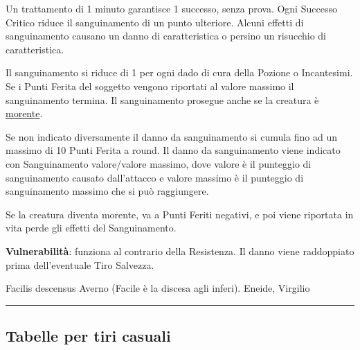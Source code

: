 \begin{multicols}{2}
Un trattamento di 1 minuto garantisce 1 successo, senza prova. Ogni Successo Critico riduce il sanguinamento di un punto ulteriore. Alcuni effetti di sanguinamento causano un danno di caratteristica o persino un risucchio di caratteristica.

Il sanguinamento si riduce di 1 per ogni dado di cura della Pozione o Incantesimi. Se i Punti Ferita del soggetto vengono riportati al valore massimo il sanguinamento termina. Il sanguinamento prosegue anche se la creatura è \hyperlink{morente}{morente}.

Se non indicato diversamente il danno da sanguinamento si cumula fino ad un massimo di 10 Punti Ferita a round. Il danno da sanguinamento viene indicato con Sanguinamento valore/valore massimo, dove valore è il punteggio di sanguinamento causato dall'attacco e valore massimo è il punteggio di sanguinamento massimo che si può raggiungere.

Se la creatura diventa morente, va a Punti Feriti negativi, e poi viene riportata in vita perde gli effetti del Sanguinamento.

\textbf{Vulnerabilità}: funziona al contrario della Resistenza. Il danno viene raddoppiato prima dell'eventuale Tiro Salvezza.

\end{multicols}

\vfill

\begin{enfasi}
	Facilis descensus Averno (Facile è la discesa agli inferi). Eneide, Virgilio
\end{enfasi}

\pagebreak

\noindent\rule{\textwidth}{0.4pt}

\subsection{Tabelle per tiri casuali}

